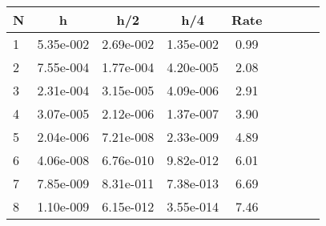 \begin{tabular}{lcccccccc}
N & h & h/2 & h/4 & Rate\\
\hline
1& 5.35e-002& 2.69e-002& 1.35e-002& 0.99\\
2& 7.55e-004& 1.77e-004& 4.20e-005& 2.08\\
3& 2.31e-004& 3.15e-005& 4.09e-006& 2.91\\
4& 3.07e-005& 2.12e-006& 1.37e-007& 3.90\\
5& 2.04e-006& 7.21e-008& 2.33e-009& 4.89\\
6& 4.06e-008& 6.76e-010& 9.82e-012& 6.01\\
7& 7.85e-009& 8.31e-011& 7.38e-013& 6.69\\
8& 1.10e-009& 6.15e-012& 3.55e-014& 7.46\\
\hline
\end{tabular}

